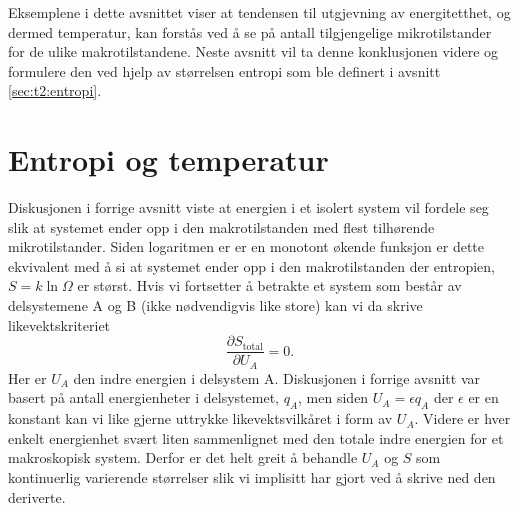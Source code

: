 Eksemplene i dette avsnittet viser at tendensen til utgjevning av energitetthet, og dermed temperatur, kan forstås ved å se på antall tilgjengelige mikrotilstander for de ulike makrotilstandene. Neste avsnitt vil ta denne konklusjonen videre og formulere den ved hjelp av størrelsen entropi som ble definert i avsnitt \ref{sec:t2:entropi}.

\section{Entropi og temperatur}
Diskusjonen i forrige avsnitt viste at energien i et isolert system vil fordele seg slik at systemet ender opp i den makrotilstanden med flest tilhørende mikrotilstander. Siden logaritmen er er en monotont økende funksjon er dette ekvivalent med å si at systemet ender opp i den makrotilstanden der entropien, $S = k\ln\Omega$ er størst. Hvis vi fortsetter å betrakte et system som består av delsystemene A og B (ikke nødvendigvis like store) kan vi da skrive likevektskriteriet
\begin{equation}
	\frac{\partial S_\text{total}}{\partial U_A} = 0.
	\label{eq:t2:likevekt1}
\end{equation}
Her er $U_A$ den indre energien i delsystem A. Diskusjonen i forrige avsnitt var basert på antall energienheter i delsystemet, $q_A$, men siden $U_A = \epsilon q_A$ der $\epsilon$ er en konstant kan vi like gjerne uttrykke likevektsvilkåret i form av $U_A$. Videre er hver enkelt energienhet svært liten sammenlignet med den totale indre energien for et makroskopisk system. Derfor er det helt greit å behandle $U_A$ og $S$ som kontinuerlig varierende størrelser slik vi implisitt har gjort ved å skrive ned den deriverte.

